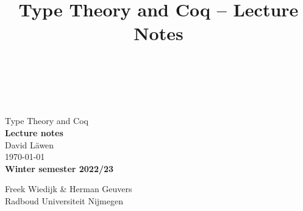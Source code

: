 \documentclass[acmsmall, nonacm, screen, dvipsnames]{acmart}
\begin{document}
\emergencystretch=12pt

\thispagestyle{empty}
\begin{titlepage}
 \begin{center}
  {\LARGE \mbox{} }\\
  {\large \mbox{} \\
  \mbox{} \\[4cm]}
  {\huge Type Theory and Coq\\[2cm]}
  {\Large\bf Lecture notes\\[1.5cm]}
 {\large David Läwen}\\[0.5cm]
\today\\[4cm]
{\small\bf Winter semester 2022/23}\\[0.5cm]
  \parbox{7cm}{%
  	\begin{center}%
  		{\large Freek Wiedijk \& Herman Geuvers}\\[1mm]
		{\footnotesize
			Radboud Universiteit Nijmegen\\
			\mbox{} }%
	\end{center}}
  \end{center}
\end{titlepage}

\title{Type Theory and Coq -- Lecture Notes}

\authorsaddresses{}

\thispagestyle{empty}
\tableofcontents
{}
\newpage


\setcounter{page}{3}











\end{document}
